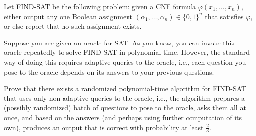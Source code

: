 \documentclass[12pt]{article}
\begin{document}
\begin{problem}{2}
Let \textsc{FIND-SAT} be the following problem: given a CNF formula \(\varphi(x_1, \ldots, x_n)\), either output any one Boolean assignment \((\alpha_1, \ldots, \alpha_n) \in \{0, 1\}^n\) that satisfies \(\varphi\), or else report that no such assignment exists.

Suppose you are given an oracle for \textsc{SAT}. As you know, you can invoke this oracle repeatedly to solve \textsc{FIND-SAT} in polynomial time. However, the standard way of doing this requires adaptive queries to the oracle, i.e., each question you pose to the oracle depends on its answers to your previous questions. 

Prove that there exists a randomized polynomial-time algorithm for \textsc{FIND-SAT} that uses only non-adaptive queries to the oracle, i.e., the algorithm prepares a (possibly randomized) batch of questions to pose to the oracle, asks them all at once, and based on the answers (and perhaps using further computation of its own), produces an output that is correct with probability at least \(\frac{2}{3}\).

\end{problem}
\end{document}
